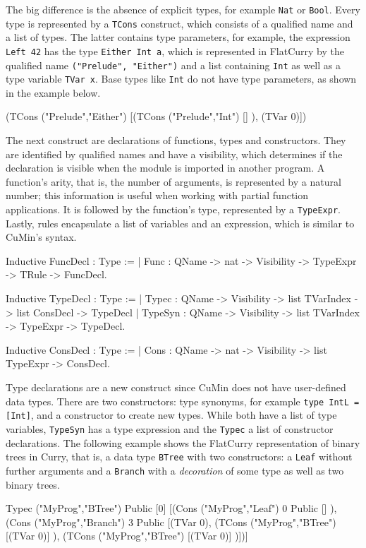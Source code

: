 \documentclass[paper = a4, fleqn, twoside]{scrreprt}
\newcommand{\coqinline}[1]{\texttt{#1}}
\begin{document}
The big difference is the absence of explicit types, for example \texttt{Nat} or \texttt{Bool}.  Every type is represented by a \coqinline{TCons} construct, which consists of a qualified name and a list of types. The latter contains type parameters, for example, the expression \texttt{Left 42} has the type \texttt{Either Int a}, which is represented in FlatCurry by the qualified name \texttt{("Prelude", "Either")} and a list containing \texttt{Int} as well as a type variable \texttt{TVar x}. Base types like \texttt{Int} do not have type parameters, as shown in the example below.
\begin{coqcode}
(TCons ("Prelude","Either") [(TCons ("Prelude","Int") [] ), (TVar 0)])
\end{coqcode}
The next construct are declarations of functions, types and constructors. They are identified by qualified names and have a visibility, which determines if the declaration is visible when the module is imported in another program. A function's arity, that is, the number of arguments, is represented by a natural number; this information is useful when working with partial function applications. It is followed by the function's type, represented by a \coqinline{TypeExpr}. Lastly, rules encapsulate a list of variables and an expression, which is similar to CuMin's syntax.
\begin{coqcode}
Inductive FuncDecl : Type := 
  | Func : QName -> nat -> Visibility -> TypeExpr -> TRule -> FuncDecl.

Inductive TypeDecl : Type :=
  | Typec   : QName -> Visibility -> list TVarIndex -> list ConsDecl -> TypeDecl
  | TypeSyn : QName -> Visibility -> list TVarIndex -> TypeExpr      -> TypeDecl.
  
Inductive ConsDecl : Type :=
  | Cons :  QName -> nat -> Visibility -> list TypeExpr -> ConsDecl.
\end{coqcode}
Type declarations are a new construct since CuMin does not have user-defined data types. There are two constructors: type synonyms, for example \texttt{type IntL = [Int]}, and a constructor to create new types. While both have a list of type variables, \texttt{TypeSyn} has a type expression and the \texttt{Typec} a list of constructor declarations. The following example shows the FlatCurry representation of binary trees in Curry, that is, a data type \texttt{BTree} with two constructors: a \texttt{Leaf} without further arguments and a \texttt{Branch} with a \textit{decoration} of some type as well as two binary trees.
\begin{coqcode}
Typec ("MyProg","BTree") Public  [0]  
  [(Cons ("MyProg","Leaf") 0 Public  [] ),
   (Cons ("MyProg","Branch") 3 Public
     [(TVar 0), 
      (TCons ("MyProg","BTree") [(TVar 0)] ), 
      (TCons ("MyProg","BTree") [(TVar 0)] )])]
\end{coqcode}
\end{document}
